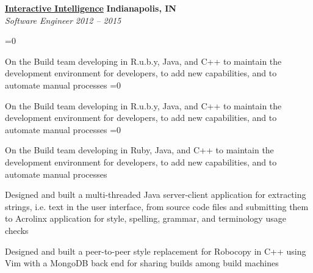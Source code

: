 %
    \headerrow
        {\textbf{\href{https://www.genesys.com/inin}{Interactive Intelligence}}}
        {\textbf{Indianapolis, IN}}
    \\
    \headerrow
        {\emph{Software Engineer}}
        {\emph{2012 -- 2015}}
    \begin{itemize*}
        \ifnum{}=0
            \item On the Build team developing in R.u.b.y, Java, and C++ to maintain the development environment for developers,
                to add new capabilities, and to automate manual processes
        \fi
        \ifnum{}=0
            \item On the Build team developing in R.u.b.y, Java, and C++ to maintain the development environment for developers,
                to add new capabilities, and to automate manual processes
        \fi
        \ifnum{}=0
            \item On the Build team developing in Ruby, Java, and C++ to maintain the development environment for developers,
                to add new capabilities, and to automate manual processes
        \fi
        \item Designed and built a multi-threaded Java server-client application for extracting strings, i.e. text in the user
            interface, from source code files and submitting them to Acrolinx application for style, spelling, grammar,
            and terminology usage checks
        \item Designed and built a peer-to-peer style replacement for Robocopy in C++ using Vim with a MongoDB back end
                for sharing builds among build machines
    \end{itemize*}

